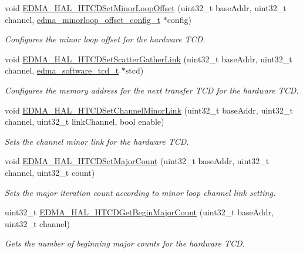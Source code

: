 \begin{DoxyCompactItemize}
void \hyperlink{group__edma__hal_ga85dc3cf5ca9b9aef2c58b5cfdfbd1818}{E\+D\+M\+A\+\_\+\+H\+A\+L\+\_\+\+H\+T\+C\+D\+Set\+Minor\+Loop\+Offset} (uint32\+\_\+t base\+Addr, uint32\+\_\+t channel, \hyperlink{group__edma__hal_gad5e547af3f3fbe7a4250c05007e65ce9}{edma\+\_\+minorloop\+\_\+offset\+\_\+config\+\_\+t} $\ast$config)
\begin{DoxyCompactList}\small\item\em Configures the minor loop offset for the hardware T\+CD. \end{DoxyCompactList}\item 
void \hyperlink{group__edma__hal_gaa92382fc5e5b42191d35420812806410}{E\+D\+M\+A\+\_\+\+H\+A\+L\+\_\+\+H\+T\+C\+D\+Set\+Scatter\+Gather\+Link} (uint32\+\_\+t base\+Addr, uint32\+\_\+t channel, \hyperlink{group__edma__hal_ga7cc4084521c106d714c925fddff92b40}{edma\+\_\+software\+\_\+tcd\+\_\+t} $\ast$stcd)
\begin{DoxyCompactList}\small\item\em Configures the memory address for the next transfer T\+CD for the hardware T\+CD. \end{DoxyCompactList}\item 
void \hyperlink{group__edma__hal_ga7739a5da12a70aa0d2edb8bf2a423fc8}{E\+D\+M\+A\+\_\+\+H\+A\+L\+\_\+\+H\+T\+C\+D\+Set\+Channel\+Minor\+Link} (uint32\+\_\+t base\+Addr, uint32\+\_\+t channel, uint32\+\_\+t link\+Channel, bool enable)
\begin{DoxyCompactList}\small\item\em Sets the channel minor link for the hardware T\+CD. \end{DoxyCompactList}\item 
void \hyperlink{group__edma__hal_ga0f403a46d04cfc90feaa358b3d8a96a0}{E\+D\+M\+A\+\_\+\+H\+A\+L\+\_\+\+H\+T\+C\+D\+Set\+Major\+Count} (uint32\+\_\+t base\+Addr, uint32\+\_\+t channel, uint32\+\_\+t count)
\begin{DoxyCompactList}\small\item\em Sets the major iteration count according to minor loop channel link setting. \end{DoxyCompactList}\item 
uint32\+\_\+t \hyperlink{group__edma__hal_ga1bb524b961b71348221adb2b6bb86b2e}{E\+D\+M\+A\+\_\+\+H\+A\+L\+\_\+\+H\+T\+C\+D\+Get\+Begin\+Major\+Count} (uint32\+\_\+t base\+Addr, uint32\+\_\+t channel)
\begin{DoxyCompactList}\small\item\em Gets the number of beginning major counts for the hardware T\+CD. \end{DoxyCompactList}\item 

\end{DoxyCompactItemize}
